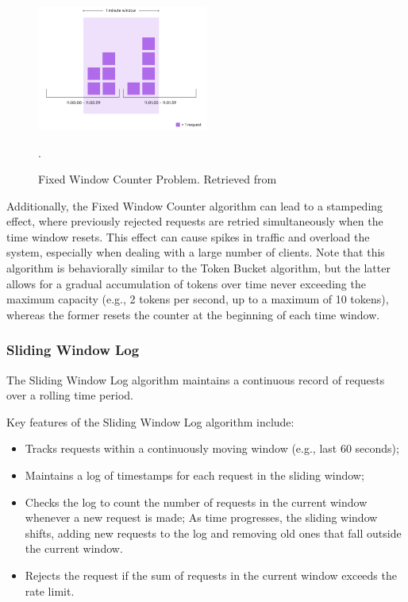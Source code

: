 \begin{figure}[!htb]
    \centering
    \includegraphics[width=0.5\textwidth]{../figures/06_fixed-window-counter-problem}
    \caption{Fixed Window Counter Problem.
    Retrieved from~\cite{medium-rate-limiting-algorithms}}.
    \label{fig:fixed-window-counter-problem}
\end{figure}

Additionally, the Fixed Window Counter algorithm can lead to a stampeding effect,
where previously rejected requests are retried simultaneously when the time window resets.
This effect can cause spikes in traffic and overload the system, especially when dealing with a large number of clients.
Note that this algorithm is behaviorally similar to the Token Bucket algorithm,
but the latter allows for a gradual accumulation of tokens over time never exceeding the maximum capacity
(e.g., 2 tokens per second, up to a maximum of 10 tokens), whereas the former resets the counter at the beginning of each time window.

\subsubsection{Sliding Window Log}\label{subsubsec:sliding-window-log-algorithm}

The Sliding Window Log algorithm maintains a continuous record of requests over a rolling time period.

Key features of the Sliding Window Log algorithm include:

\begin{itemize}
    \item Tracks requests within a continuously moving window (e.g., last 60 seconds);
    \item Maintains a log of timestamps for each request in the sliding window;
    \item Checks the log to count the number of requests in the current window whenever a new request is made;
    \itme As time progresses, the sliding window shifts, adding new requests to the log and removing old ones that fall outside the current window.
    \item Rejects the request if the sum of requests in the current window exceeds the rate limit.
\end{itemize}

